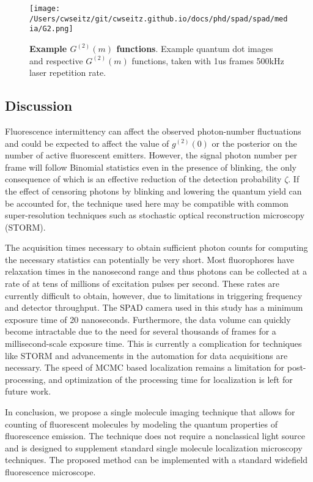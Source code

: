 \begin{figure*}[t]
\centering
\texttt{[image: /Users/cwseitz/git/cwseitz.github.io/docs/phd/spad/spad/media/G2.png]}
\caption{\textbf{Example $G^{(2)}(m)$ functions}. Example quantum dot images and respective $G^{(2)}(m)$ functions, taken with 1us frames 500kHz laser repetition rate.}
\label{fig:fig32}
\end{figure*}    

\subsection{Discussion}

Fluorescence intermittency can affect the observed photon-number fluctuations and could be expected to affect the value of $g^{(2)}(0)$ or the posterior on the number of active fluorescent emitters. However, the signal photon number per frame will follow Binomial statistics even in the presence of blinking, the only consequence of which is an effective reduction of the detection probability $\zeta$. If the effect of censoring photons by blinking and lowering the quantum yield can be accounted for, the technique used here may be compatible with common super-resolution techniques such as stochastic optical reconstruction microscopy (STORM). 

The acquisition times necessary to obtain sufficient photon counts for computing the necessary statistics can potentially be very short. Most fluorophores have relaxation times in the nanosecond range and thus photons can be collected at a rate of at tens of millions of excitation pulses per second. These rates are currently difficult to obtain, however, due to limitations in triggering frequency and detector throughput. The SPAD camera used in this study has a minimum exposure time of 20 nanoseconds. Furthermore, the data volume can quickly become intractable due to the need for several thousands of frames for a millisecond-scale exposure time. This is currently a complication for techniques like STORM and advancements in the automation for data acquisitions are necessary. The speed of MCMC based localization remains a limitation for post-processing, and optimization of the processing time for localization is left for future work. 

In conclusion, we propose a single molecule imaging technique that allows for counting of fluorescent molecules by modeling the quantum properties of fluorescence emission. The technique does not require a nonclassical light source and is designed to supplement standard single molecule localization microscopy techniques. The proposed method can be implemented with a standard widefield fluorescence microscope.

